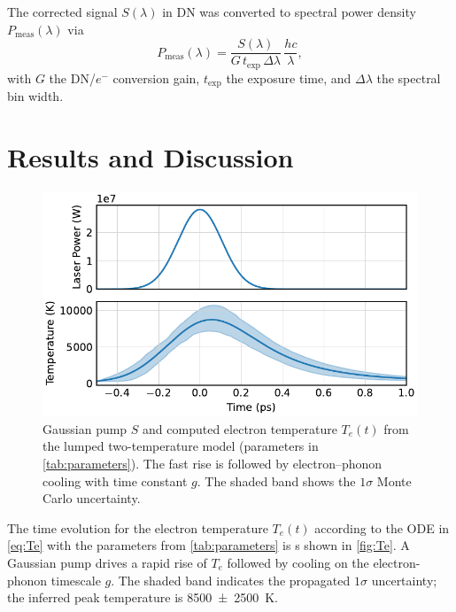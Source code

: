 \documentclass[
	parskip=half,
	a4paper,
]{scrarticle}
\begin{document}
The corrected signal \(S(\lambda)\) in DN was converted to spectral power density \(P_{\text{meas}}(\lambda)\) via
\begin{equation}
  P_{\text{meas}}(\lambda)
  = \frac{S(\lambda)}{G\,t_{\text{exp}}\,\Delta\lambda}\,\frac{hc}{\lambda},
\end{equation}
with \(G\) the DN/\(e^-\) conversion gain, \(t_{\text{exp}}\) the exposure time, and \(\Delta\lambda\) the spectral bin width.  


\section{Results and Discussion}
\begin{figure}
    \centering
    \includegraphics{../analysis/figures/model te.pdf}
    \caption{Gaussian pump \(S\) and computed electron temperature \(T_e(t)\) from the lumped two-temperature model (parameters in \autoref{tab:parameters}). The fast rise is followed by electron–phonon cooling with time constant \(g\). The shaded band shows the \(1\sigma\) Monte Carlo uncertainty.}
    \label{fig:Te}
\end{figure}
The time evolution for the electron temperature \(T_e(t)\) according to the ODE in \autoref{eq:Te} with the parameters from \autoref{tab:parameters} is s shown in \autoref{fig:Te}.
A Gaussian pump drives a rapid rise of \(T_e\) followed by cooling on the electron-phonon timescale \(g\). The shaded band indicates the propagated $1\sigma$ uncertainty; the inferred peak temperature is \SI{8500(2500)}{\kelvin}.
\end{document}
